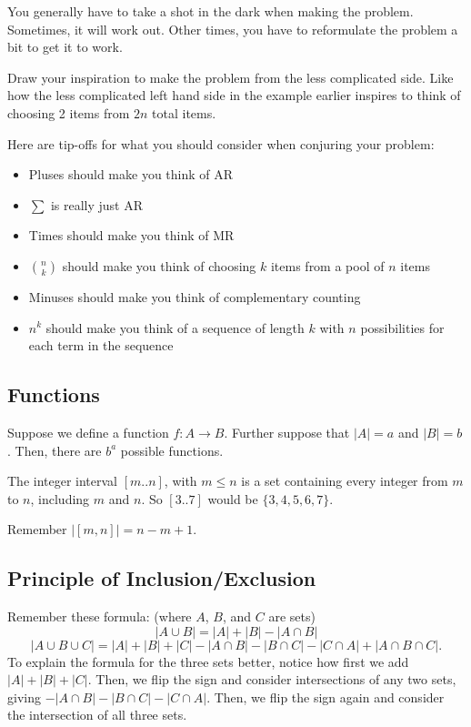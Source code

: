 \documentclass[11pt]{scrartcl}
\begin{document}
\begin{advice}
You generally have to take a shot in the dark when making the problem. Sometimes, it will work out. Other times, you have to reformulate the problem a bit to get it to work.

Draw your inspiration to make the problem from the less complicated side. Like how the less complicated left hand side in the example earlier inspires to think of choosing 2 items from $2n$ total items.
\end{advice}

\begin{advice}
Here are tip-offs for what you should consider when conjuring your problem:
    \begin{itemize}
        \item Pluses should make you think of AR
        \item $\sum$ is really just AR
        \item Times should make you think of MR
        \item $\binom{n}{k}$ should make you think of choosing $k$ items from a pool of $n$ items
        \item Minuses should make you think of complementary counting
        \item $n^k$ should make you think of a sequence of length $k$ with $n$ possibilities for each term in the sequence
    \end{itemize}
\end{advice}

\subsection{Functions}

Suppose we define a function $f: A \rightarrow B$. Further suppose that $|A| = a$ and $|B| = b$. Then, there are $b^a$ possible functions.

The integer interval $[m..n]$, with $m \leq n$ is a set containing every integer from $m$ to $n$, including $m$ and $n$. So $[3..7]$ would be $\{3, 4, 5, 6, 7\}$.

Remember $|[m, n]| = n - m + 1$.

\subsection{Principle of Inclusion/Exclusion}

Remember these formula: (where $A$, $B$, and $C$ are sets)
\[|A \cup B| = |A| + |B| - |A \cap B|\]
\[|A \cup B \cup C| = |A| + |B| + |C| - |A \cap B| - |B \cap C| - |C \cap A| + |A \cap B \cap C|.\] To explain the formula for the three sets better, notice how first we add $|A| + |B| + |C|$. Then, we flip the sign and consider intersections of any two sets, giving $-|A \cap B| - |B \cap C| - |C \cap A|$. Then, we flip the sign again and consider the intersection of all three sets.
\end{document}

